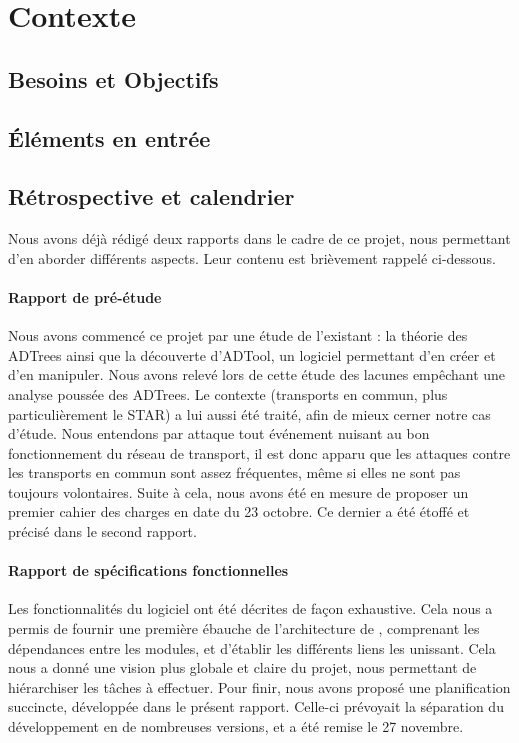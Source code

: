 \section{Contexte}

	\subsection{Besoins et Objectifs}
	
	\subsection{Éléments en entrée}
	
	\subsection{Rétrospective et calendrier}
	Nous avons déjà rédigé deux rapports dans le cadre de ce projet, nous permettant d'en aborder différents aspects. Leur contenu est brièvement rappelé ci-dessous.

	\paragraph{Rapport de pré-étude} Nous avons commencé ce projet par une étude de l'existant : la théorie des ADTrees ainsi que la découverte d'ADTool, un logiciel permettant d'en créer et d'en manipuler. Nous avons relevé lors de cette étude des lacunes empêchant une analyse poussée des ADTrees. Le contexte (transports en commun, plus particulièrement le STAR) a lui aussi été traité, afin de mieux cerner notre cas d'étude. Nous entendons par \og attaque \fg{} tout événement nuisant au bon fonctionnement du réseau de transport, il est donc apparu que les attaques contre les transports en commun sont assez fréquentes, même si elles ne sont pas toujours volontaires. Suite à cela, nous avons été en mesure de proposer un premier cahier des charges en date du 23 octobre. Ce dernier a été étoffé et précisé dans le second rapport.

	\paragraph{Rapport de spécifications fonctionnelles} Les fonctionnalités du logiciel ont été décrites de façon exhaustive. Cela nous a permis de fournir une première ébauche de l'architecture de \glasir{}, comprenant les dépendances entre les modules, et d'établir les différents liens les unissant. Cela nous a donné une vision plus globale et claire du projet, nous permettant de hiérarchiser les tâches à effectuer. Pour finir, nous avons proposé une planification succincte, développée dans le présent rapport. Celle-ci prévoyait la séparation du développement en de nombreuses versions, et a été remise le 27 novembre.

